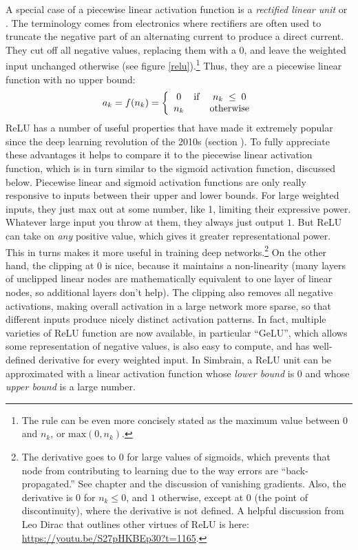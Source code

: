 A special case of a piecewise linear activation function is a \emph{rectified linear unit} or . The terminology comes from electronics where rectifiers are often used to truncate the negative part of an alternating current to produce a direct current. They cut off all negative values, replacing them with a 0, and leave the weighted input unchanged otherwise (see figure \ref{relu}).\footnote{The rule can be even more concisely stated as the maximum value between 0 and $n_k$, or $\mbox{max}(0,n_k)$.} Thus, they are a piecewise linear function with no upper bound:
\begin{eqnarray*}
a_k = f(n_k) =  
\left\{
      \begin{array}{clc}
                  0      & {\rm if} &   n_k\; \leq \; 0          \\  
              n_k  &  &  \mbox{otherwise}	
      \end{array} 
\right.
\end{eqnarray*}
ReLU has a number of useful properties that have made it extremely popular since the deep learning revolution of the 2010s (section ). To fully appreciate these advantages it helps to compare it to the piecewise linear activation function, which is in turn similar to the sigmoid activation function, discussed below. Piecewise linear and sigmoid activation functions are only really responsive to inputs between their upper and lower bounds. For large weighted inputs, they just max out at some number, like 1, limiting their expressive power. Whatever large input you throw at them, they always just output $1$. But ReLU can take on \emph{any} positive value, which gives it greater representational power. This in turns makes it more useful in training deep networks.\footnote{The derivative goes to 0 for large values of sigmoids, which prevents that node from contributing to learning due to the way errors are ``back-propagated.''  See chapter  and the discussion of vanishing gradients. Also, the derivative is $0$ for $n_k \leq 0$, and $1$ otherwise, except at $0$ (the point of discontinuity), where the derivative is not defined.  A helpful discussion from Leo Dirac that outlines other virtues of ReLU is here: \url{https://youtu.be/S27pHKBEp30?t=1165}. }  On the other hand, the clipping at $0$ is nice, because it maintains a non-linearity (many layers of unclipped linear nodes are mathematically equivalent to one layer of linear nodes, so additional layers don't help). The clipping also removes all negative activations, making overall activation in a large network more sparse, so that different inputs produce nicely distinct activation patterns. In fact, multiple varieties of ReLU function are now available, in particular ``GeLU'', which allows some representation of negative values, is also easy to compute, and has well-defined derivative for every weighted input.  In Simbrain, a ReLU unit can be approximated with a linear activation function whose \emph{lower bound} is 0 and whose \emph{upper bound} is a large number.

